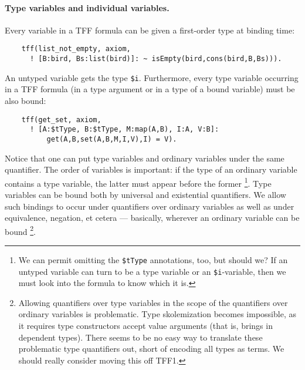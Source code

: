 \paragraph{Type variables and individual variables.}
Every variable in a TFF formula can be given a first-order type
at binding time:
\begin{verbatim}
    tff(list_not_empty, axiom,
      ! [B:bird, Bs:list(bird)]: ~ isEmpty(bird,cons(bird,B,Bs))).
\end{verbatim}
An untyped variable gets the type \verb+$i+.
Furthermore, every type variable occurring in a TFF formula
(in a type argument or in a type of a bound variable)
must be also bound:
\begin{verbatim}
    tff(get_set, axiom,
      ! [A:$tType, B:$tType, M:map(A,B), I:A, V:B]:
          get(A,B,set(A,B,M,I,V),I) = V).
\end{verbatim}
Notice that one can put type variables and ordinary variables
under the same quantifier. The order of variables is important:
if the type of an ordinary variable contains a type variable,
the latter must appear before the former%
\footnote{We can permit omitting the {\tt\$tType} annotations,
too, but should we? If an untyped variable can turn to be
a type variable or an {\tt\$i}-variable, then we must look
into the formula to know which it is.}.
Type variables can be bound both by universal and existential
quantifiers.
We allow such bindings to occur under quantifiers over ordinary
variables as well as under equivalence, negation, et cetera ---
basically, wherever an ordinary variable can be bound%
\footnote{Allowing quantifiers over type variables in the scope
of the quantifiers over ordinary variables is problematic.
Type skolemization becomes impossible, as it requires type
constructors accept value arguments (that is, brings in
dependent types). There seems to be no easy way to translate
these problematic type quantifiers out, short of encoding all
types as terms. We should really consider moving this off TFF1.}.

